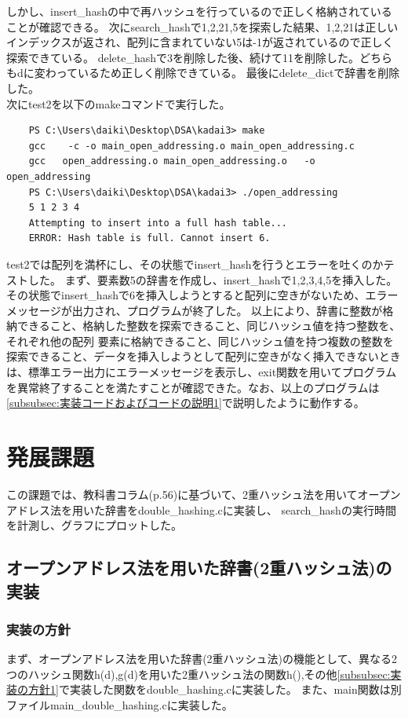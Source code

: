 \documentclass{ltjsarticle}
\begin{document}
しかし、insert\_hashの中で再ハッシュを行っているので正しく格納されていることが確認できる。
次にsearch\_hashで1,2,21,5を探索した結果、1,2,21は正しいインデックスが返され、配列に含まれていない5は-1が返されているので正しく探索できている。
delete\_hashで3を削除した後、続けて11を削除した。どちらもdに変わっているため正しく削除できている。
最後にdelete\_dictで辞書を削除した。\\ \indent
次にtest2を以下のmakeコマンドで実行した。
\begin{lstlisting}
    PS C:\Users\daiki\Desktop\DSA\kadai3> make
    gcc    -c -o main_open_addressing.o main_open_addressing.c
    gcc   open_addressing.o main_open_addressing.o   -o open_addressing
    PS C:\Users\daiki\Desktop\DSA\kadai3> ./open_addressing
    5 1 2 3 4 
    Attempting to insert into a full hash table...
    ERROR: Hash table is full. Cannot insert 6.
\end{lstlisting}
test2では配列を満杯にし、その状態でinsert\_hashを行うとエラーを吐くのかテストした。
まず、要素数5の辞書を作成し、insert\_hashで1,2,3,4,5を挿入した。
その状態でinsert\_hashで6を挿入しようとすると配列に空きがないため、エラーメッセージが出力され、プログラムが終了した。
以上により、辞書に整数が格納できること、格納した整数を探索できること、同じハッシュ値を持つ整数を、それぞれ他の配列
要素に格納できること、同じハッシュ値を持つ複数の整数を探索できること、データを挿入しようとして配列に空きがなく挿入できないときは、標準エラー出力にエラーメッセージを表示し、exit関数を用いてプログラムを異常終了することを満たすことが確認できた。なお、以上のプログラムは\ref{subsubsec:実装コードおよびコードの説明1}で説明したように動作する。

\section{発展課題}
この課題では、教科書コラム(p.56)に基づいて、2重ハッシュ法を用いてオープンアドレス法を用いた辞書をdouble\_hashing.cに実装し、
search\_hashの実行時間を計測し、グラフにプロットした。
\subsection{オープンアドレス法を用いた辞書(2重ハッシュ法)の実装}
\subsubsection{実装の方針}
まず、オープンアドレス法を用いた辞書(2重ハッシュ法)の機能として、異なる2つのハッシュ関数h(d),g(d)を用いた2重ハッシュ法の関数h(),その他\ref{subsubsec:実装の方針1}で実装した関数をdouble\_hashing.cに実装した。
また、main関数は別ファイルmain\_double\_hashing.cに実装した。
\end{document}
